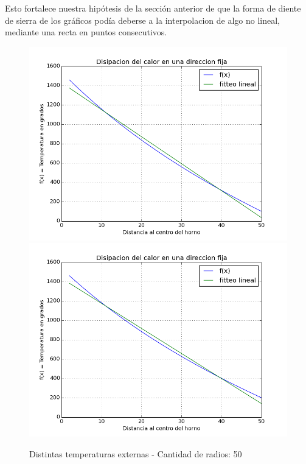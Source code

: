 Esto fortalece nuestra hipótesis de la sección anterior de que la forma de diente de sierra de los gráficos podía deberse a la interpolacion de algo no lineal, mediante una recta en puntos consecutivos.


\begin{figure}[h]
\centering
\includegraphics[scale=0.34]{funcion_temp_50_radios_ti_1500_te_102.png}
\includegraphics[scale=0.34]{funcion_temp_50_radios_ti_1500_te_202.png}
\caption{Distintas temperaturas externas - Cantidad de radios: 50}
\end{figure}

